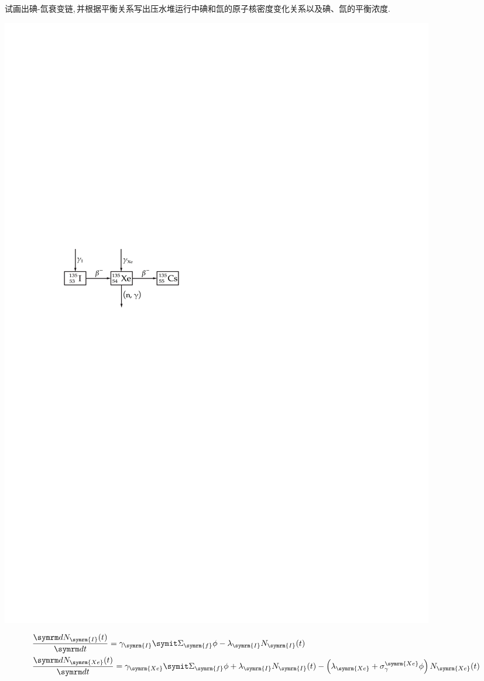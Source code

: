 \begin{exercise}
    试画出碘-氙衰变链,\,并根据平衡关系写出压水堆运行中碘和氙的原子核密度变化关系以及碘、氙的平衡浓度.\,
    \begin{solution}

        \begin{minipage}{0.2\columnwidth}
            \includegraphics[scale=0.8]{figures/fig6.7.pdf}
        \end{minipage}
        \hfil
        \begin{minipage}{0.8\columnwidth}
            \begin{align*}
                & \dv{N_{\symrm{I}}(t)}{t} = \gamma_{\symrm{I}} \vSigma_{\symrm{f}} \phi - \lambda_{\symrm{I}} N_{\symrm{I}}(t) \\
                & \dv{N_{\symrm{Xe}}(t)}{t} = \gamma_{\symrm{Xe}} \vSigma_{\symrm{f}} \phi + \lambda_{\symrm{I}} N_{\symrm{I}}(t) - \left(\lambda_{\symrm{Xe}} + \sigma_{\gamma}^{\symrm{Xe}} \phi\right) N_{\symrm{Xe}}(t)
            \end{align*}
        \end{minipage}


\end{solution}
\end{exercise}
